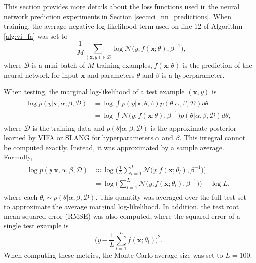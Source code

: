\documentclass[msc,deptreport.inf]{infthesis} %
\newcommand{\matr}[1]{\mathbf{#1}}
\begin{document}
This section provides more details about the loss functions used in the neural network prediction experiments in Section \ref{sec:uci_nn_predictions}. When training, the average negative log-likelihood term used on line 12 of Algorithm \ref{alg:vi_fa} was set to
\begin{equation}\label{eqn:train_nll}
	-\frac{1}{M} \sum_{(\matr{x}, y) \in \mathcal{B}} \log \mathcal{N}\big(y; f(\matr{x}; \theta), \beta^{-1}\big),
\end{equation}
where $\mathcal{B}$ is a mini-batch of $M$ training examples, $f(\matr{x}; \theta)$ is the prediction of the neural network for input $\matr{x}$ and parameters $\theta$ and $\beta$ is a hyperparameter. 

When testing, the marginal log-likelihood of a test example $(\matr{x}, y)$ is
\begin{align}
\begin{split}
	\log p(y | \matr{x}, \alpha, \beta, \mathcal{D}) 
	& = \log \int p(y | \matr{x}, \theta, \beta) p(\theta | \alpha, \beta, \mathcal{D}) d\theta \\
	& = \log \int \mathcal{N}\big(y; f(\matr{x}; \theta), \beta^{-1}\big) p(\theta | \alpha, \beta, \mathcal{D}) d\theta,
\end{split}
\end{align}
where $\mathcal{D}$ is the training data and $p(\theta | \alpha, \beta, \mathcal{D})$ is the approximate posterior learned by VIFA or SLANG for hyperparameters $\alpha$ and $\beta$. This integral cannot be computed exactly. Instead, it was approximated by a sample average. Formally, 
\begin{align}
\begin{split}
	\log p(y | \matr{x}, \alpha, \beta, \mathcal{D}) 
	& \approx \log \Bigg( \frac{1}{L} \sum_{l=1}^L \mathcal{N}\big(y; f(\matr{x}; \theta_l), \beta^{-1}\big) \Bigg) \\
	& = \log \Bigg( \sum_{l=1}^L \mathcal{N}\big(y; f(\matr{x}; \theta_l), \beta^{-1}\big) \Bigg) - \log L,
\end{split}
\end{align}
where each $\theta_l \sim p(\theta | \alpha, \beta, \mathcal{D})$. This quantity was averaged over the full test set to approximate the average marginal log-likelihood. In addition, the test root mean squared error (RMSE) was also computed, where the squared error of a single test example is
\begin{equation}
	\Bigg(y - \frac{1}{L} \sum_{l=1}^L f(\matr{x}; \theta_l)\Bigg)^2.
\end{equation}
When computing these metrics, the Monte Carlo average size was set to $L=100$.
\end{document}
